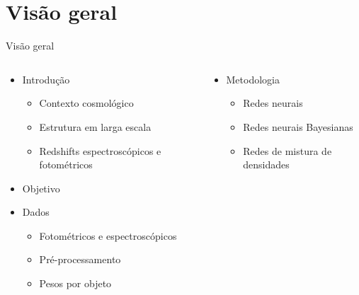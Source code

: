 
\section{Visão geral}
\begin{frame}[c]{Visão geral}
    \begin{columns}[c]
        \vspace*{-0.5cm}
        \begin{column}{0.48\linewidth}
            \begin{splusbox}{}
                \begin{itemize}
                    \item Introdução
                    \begin{itemize}
                        \item Contexto cosmológico
                        \item Estrutura em larga escala
                        \item Redshifts espectroscópicos e fotométricos
                    \end{itemize}
                    \item Objetivo
                    \item Dados
                    \begin{itemize}
                        \item Fotométricos e espectroscópicos
                        \item Pré-processamento
                        \item Pesos por objeto
                    \end{itemize}
                \end{itemize}
            \end{splusbox}
        \end{column}
        \begin{column}{0.48\linewidth}
            \begin{splusbox}{}
                \begin{itemize}
                    \item Metodologia
                    \begin{itemize}
                        \item Redes neurais
                        \item Redes neurais Bayesianas
                        \item Redes de mistura de densidades

\end{itemize}
\end{itemize}
\end{splusbox}
\end{column}
\end{columns}
\end{frame}

